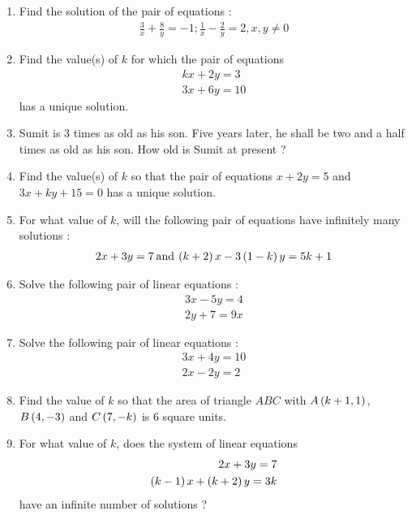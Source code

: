 \begin{enumerate}
\item Find the solution of the pair of equations :
\begin{align*}
    \frac{3}{x}+\frac{8}{y}=-1; \frac{1}{x}-\frac{2}{y}=2, x, y\neq 0
\end{align*}

\item Find the value(s) of $k$ for which the pair of equations
\begin{align*}
    kx+2y=3\\
3x+6y=10
\end{align*}
has a unique solution.
\item Sumit is $3$ times as old as his son. Five years later, he shall be two and a half times as old as his son. How old is Sumit at present ?

 \item Find the value(s) of $k$ so that the pair of equations $x + 2y = 5$ and $3x + ky + 15 = 0$ has a unique solution.

 \item For what value of $k$, will the following pair of equations have infinitely many solutions :
\begin{align*}
	2x + 3y = 7 \hspace{2pt} \text{and} \hspace{2pt} \left(k+2\right)x - 3\left(1-k\right)y = 5k+1 
\end{align*}

\item Solve the following pair of linear equations :
\begin{align*}
 3x - 5y = 4\\
2y + 7 = 9x   
\end{align*}    

\item Solve the following pair of linear equations :
\begin{align*}
 3x + 4y = 10\\
2x - 2y = 2   
\end{align*}    

\item Find the value of $k$ so that the area of triangle $ABC$ with $A\left(k + 1, 1\right)$, $B\left(4, -3\right)$ and $C\left(7, -k\right)$ is $6$ square units.


\item For what value of $k$, does the system of linear equations\\
\begin{align*}
   2x + 3y = 7\\
 \left(k - 1\right) x + \left(k + 2\right) y = 3k
\end{align*}
have an infinite number of solutions ?


\end{enumerate}
